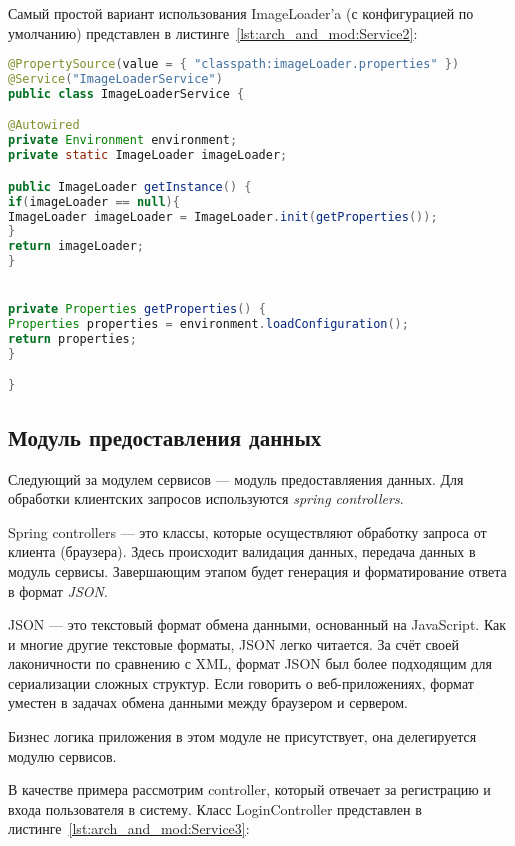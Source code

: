 Самый простой вариант использования ImageLoader'a (с конфигурацией по умолчанию) представлен  в листинге~\ref{lst:arch_and_mod:Service2}:

\begin{lstlisting}[language=Java, style=rubystyle, caption={Определение ImageLoaderService}, label=lst:arch_and_mod:Service2]
@PropertySource(value = { "classpath:imageLoader.properties" })
@Service("ImageLoaderService")
public class ImageLoaderService {

@Autowired
private Environment environment;
private static ImageLoader imageLoader;

public ImageLoader getInstance() {
if(imageLoader == null){
ImageLoader imageLoader = ImageLoader.init(getProperties());
}
return imageLoader;
}


private Properties getProperties() {
Properties properties = environment.loadConfiguration();
return properties;
}

}
\end{lstlisting}


\subsection{Модуль предоставления данных}
\label{sub:arch_and_mod:parser}
Следующий за модулем сервисов --- модуль предоставляения данных. Для обработки клиентских запросов используются \textit{spring controllers}.
 
Spring controllers --- это классы, которые осуществляют обработку запроса от клиента (браузера). Здесь происходит валидация данных, передача данных в модуль сервисы. Завершающим этапом будет генерация и форматирование ответа в формат \textit{JSON}.

JSON --- это текстовый формат обмена данными, основанный на JavaScript. Как и многие другие текстовые форматы, JSON легко читается. За счёт своей лаконичности по сравнению с XML, формат JSON был более подходящим для сериализации сложных структур. Если говорить о веб-приложениях, формат уместен в задачах обмена данными между браузером и сервером.

Бизнес логика приложения в этом модуле не присутствует, она делегируется модулю сервисов.

В качестве примера рассмотрим controller, который отвечает за регистрацию и входа пользователя в систему. Класс LoginController представлен в листинге~\ref{lst:arch_and_mod:Service3}:

